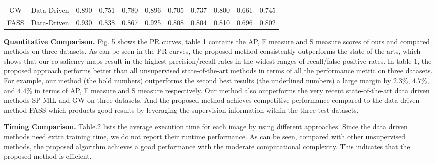 \documentclass[sigconf]{acmart}
\begin{document}
\begin{table}[!tbp]
\begin{tabular}{c|c|ccc|ccc|ccc}
GW                      & Data-Driven              & 0.890          & 0.751          & 0.780          & 0.896          & 0.705          & 0.737          & 0.800          & 0.661          & 0.745          \\
FASS                    & Data-Driven              & 0.930          & 0.838          & 0.867          & 0.925          & 0.808          & 0.804          & 0.810          & 0.696          & 0.802          \\ 
\bottomrule
\end{tabular}
\end{table}\textbf{}


\noindent \textbf{Quantitative Comparison.} Fig. 5 shows the PR curves, table 1  contains the AP, F measure and S measure scores of ours and compared methods on three datasets. As can be seen in the PR curves, the proposed method consistently outperforms the state-of-the-arts, which shows that our co-saliency maps result in the highest precision/recall rates in the widest ranges of recall/false positive rates. In table 1, the proposed approach performs better than all unsupervised state-of-the-art methods in terms of all the performance metric on three datasets. For example, our method (the bold numbers) outperforms the second best results (the underlined numbers) \cite{DBLP:conf/eccv/HsuTLQC18} a large margin by $2.3\%$, $4.7\%$, and $4.4 \%$ in terms of AP, F measure and S measure respectively. Our method also outperforms the very recent state-of-the-art data driven methods SP-MIL and GW on three datasets.  And the proposed method achieves competitive performance compared to the data driven method FASS which products good results by leveraging the supervision information within the three test datasets. 

\noindent \textbf{Timing Comparison.} Table.2 lists the average execution time for each image by using different approaches.  Since the data driven methods need extra training time, we do not report their runtime performance. As can be seen, compared with other unsupervised methods, the proposed algorithm achieves a good performance with the moderate computational complexity. This indicates that the proposed method is efficient.



\begin{table}
  \caption{Average Runtime(s) Per Image}
  \label{tab:freq}
  \renewcommand\tabcolsep{4.5pt}
\end{table}
\end{document}

